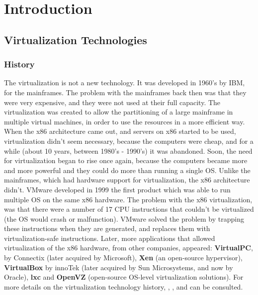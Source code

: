 \chapter{Introduction}
\label{chapter:intro}

\section{Virtualization Technologies}
\label{sec:virt-tech}

\subsection{History}
\label{sub-sec:virt-history}
The virtualization is not a new technology. It was developed in 1960's by
IBM, for the mainframes. The problem with the mainframes back then was that
they were very expensive, and they were not used at their full capacity. The
virtualization was created to allow the partitioning of a large mainframe in
multiple virtual machines, in order to use the resources in a more efficient
way. When the x86 architecture came out, and servers on x86 started to be used,
virtualization didn't seem necessary, because the computers were cheap, and for
a while (about 10 years, between 1980's - 1990's) it was abandoned. Soon, the
need for virtualization began to rise once again, because the computers became
more and more powerful and they could do more than running a single OS. Unlike
the mainframes, which had hardware support for virtualization, the x86
architecture didn't. VMware developed in 1999 the first product which was able
to run multiple OS on the same x86 hardware. The problem with the x86
virtualization, was that there were a number of 17 CPU instructions that
couldn't be virtualized (the OS would crash or malfunction). VMware solved the
problem by trapping these instructions when they are generated, and replaces
them with virtualization-safe instructions. Later, more applications that
allowed virtualization of the x86 hardware, from other companies, appeared:
\textbf{VirtualPC}, by Connectix (later acquired by Microsoft), \textbf{Xen}
(an open-source hypervisor), \textbf{VirtualBox} by innoTek (later acquired by
Sun Microsystems, and now by Oracle), \textbf{lxc} and \textbf{OpenVZ}
(open-source OS-level virtualization solutions). For more details on the
virtualization technology history, \cite{practical-virt-solutions},
\cite{advanced-server-virt}, \cite{vmware-history} and
\cite{wiki-virt-timeline} can be consulted.

